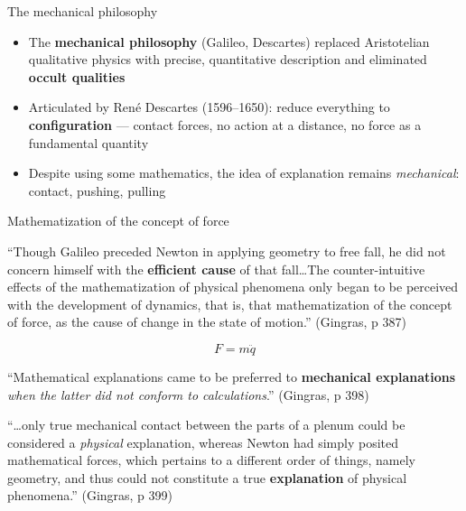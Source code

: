 \documentclass[fleqn]{beamer}
\newcommand{\kw}[1]{\textbf{#1}}
\begin{document}
\begin{frame}{The mechanical philosophy}

  \begin{itemize}
  \item The \kw{mechanical philosophy} (Galileo, Descartes) replaced
    Aristotelian qualitative physics with precise, quantitative
    description and eliminated \kw{occult qualities}
  \item Articulated by Ren{\'e} Descartes (1596--1650): reduce
    everything to \kw{configuration} --- contact forces, no action at
    a distance, no force as a fundamental quantity
  \item Despite using some mathematics, the idea of explanation
    remains \emph{mechanical}: contact, pushing, pulling
  \end{itemize}

\end{frame}

\begin{frame}{Mathematization of the concept of force}

  ``Though Galileo preceded Newton in applying geometry to free fall,
  he did not concern himself with the \kw{efficient cause} of that
  fall\dots The counter-intuitive effects of the mathematization of
  physical phenomena only began to be perceived with the development
  of dynamics, that is, that mathematization of the concept of force,
  as the cause of change in the state of motion.'' (Gingras, p 387)

  \[ F = m\ddot{q} \]

  \medskip
  ``Mathematical explanations came to be preferred to \kw{mechanical
  explanations} \emph{when the latter did not conform to
  calculations}.'' (Gingras, p 398)

\end{frame}

\begin{frame}

  ``\dots only true mechanical contact between the parts of a plenum
  could be considered a \emph{physical} explanation, whereas Newton
  had simply posited mathematical forces, which pertains to a
  different order of things, namely geometry, and thus could not
  constitute a true \kw{explanation} of physical phenomena.''
  (Gingras, p 399)

\end{frame}
\end{document}

